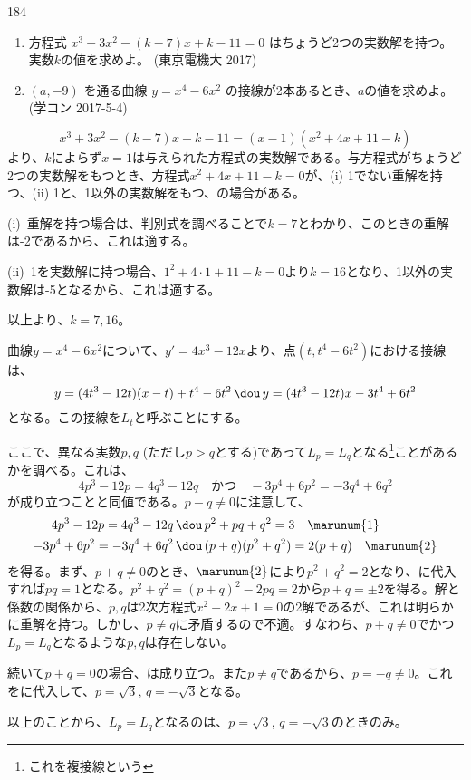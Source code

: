 \begin{thm}{184}{}{}
 \begin{enumerate}
  \item 方程式 $x^3+3x^2-(k-7)x+k-11=0$ はちょうど2つの実数解を持つ。実数$k$の値を求めよ。  (東京電機大 2017)
  \item $(a,-9)$ を通る曲線 $y=x^4-6x^2$ の接線が2本あるとき、$a$の値を求めよ。  (学コン 2017-5-4)
 \end{enumerate}
\end{thm}

\[ x^3+3x^2-(k-7)x+k-11=(x-1)(x^2+4x+11-k) \]
より、$k$によらず$x=1$は与えられた方程式の実数解である。与方程式がちょうど2つの実数解をもつとき、方程式$x^2+4x+11-k=0$が、(i) 1でない重解を持つ、(ii) 1と、1以外の実数解をもつ、の場合がある。

(i)~重解を持つ場合は、判別式を調べることで$k=7$とわかり、このときの重解は-2であるから、これは適する。

(ii)~1を実数解に持つ場合、$1^2+4\cdot 1+11-k=0$より$k=16$となり、1以外の実数解は-5となるから、これは適する。

以上より、$k=7, 16$。

曲線$y=x^4-6x^2$について、$y'=4x^3-12x$より、点$(t, t^4-6t^2)$における接線は、
\[ y=(4t^3-12t)(x-t)+t^4-6t^2 \,\dou\, y=(4t^3-12t)x-3t^4+6t^2 \]
となる。この接線を$L_t$と呼ぶことにする。

ここで、異なる実数$p, q$ (ただし$p>q$とする)であって$L_p=L_q$となる\footnote{これを複接線という}ことがあるかを調べる。これは、
\[ 4p^3-12p=4q^3-12q \quad\text{かつ}\quad -3p^4+6p^2=-3q^4+6q^2 \]
が成り立つことと同値である。$p-q\neq 0$に注意して、
\begin{align*}
 4p^3-12p=4q^3-12q \,&\dou\, p^2+pq+q^2=3 \quad \marunum{1} \\
 -3p^4+6p^2=-3q^4+6q^2 \,&\dou\, (p+q)(p^2+q^2)=2(p+q) \quad \marunum{2}
\end{align*}
を得る。まず、$p+q\neq 0$のとき、$\marunum{2}$により$p^2+q^2=2$となり、に代入すれば$pq=1$となる。$p^2+q^2=(p+q)^2-2pq=2$から$p+q=\pm 2$を得る。解と係数の関係から、$p, q$は2次方程式$x^2-2x+1=0$の2解であるが、これは明らかに重解を持つ。しかし、$p\neq q$に矛盾するので不適。すなわち、$p+q\neq 0$でかつ$L_p=L_q$となるような$p, q$は存在しない。

続いて$p+q=0$の場合、は成り立つ。また$p\neq q$であるから、$p=-q\neq 0$。これをに代入して、$p=\sqrt{3}$, $q=-\sqrt{3}$となる。

以上のことから、$L_p=L_q$となるのは、$p=\sqrt{3}$, $q=-\sqrt{3}$のときのみ。

